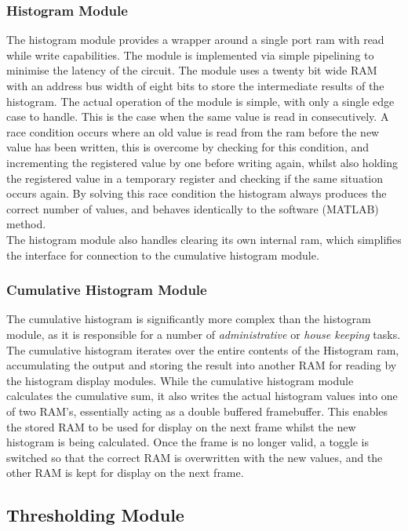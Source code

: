 \documentclass[12pt]{article}
\begin{document}
  \subsubsection{Histogram Module}
  The histogram module provides a wrapper around a single port ram with read while write capabilities. The module is implemented via simple pipelining to minimise the latency of the circuit. The module uses a twenty bit wide RAM with an address bus width of eight bits to store the intermediate results of the histogram. The actual operation of the module is simple, with only a single edge case to handle. This is the case when the same value is read in consecutively. A race condition occurs where an old value is read from the ram before the new value has been written, this is overcome by checking for this condition, and incrementing the registered value by one before writing again, whilst also holding the registered value in a temporary register and checking if the same situation occurs again. By solving this race condition the histogram always produces the correct number of values, and behaves identically to the software (MATLAB) method.\\

  The histogram module also handles clearing its own internal ram, which simplifies the interface for connection to the cumulative histogram module.
  
  \subsubsection{Cumulative Histogram Module}
  The cumulative histogram is significantly more complex than the histogram module, as it is responsible for a number of \textit{administrative} or \textit{house keeping} tasks. The cumulative histogram iterates over the entire contents of the Histogram ram, accumulating the output and storing the result into another RAM for reading by the histogram display modules. While the cumulative histogram module calculates the cumulative sum, it also writes the actual histogram values into one of two RAM's, essentially acting as a double buffered framebuffer. This enables the stored RAM to be used for display on the next frame whilst the new histogram is being calculated. Once the frame is no longer valid, a toggle is switched so that the correct RAM is overwritten with the new values, and the other RAM is kept for display on the next frame.

  \subsection{Thresholding Module}
\end{document}
